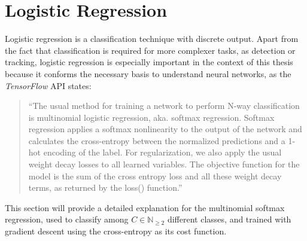 

\section{Logistic Regression} \label{logreg}

Logistic regression is a classification technique with discrete output. Apart from the fact that classification is required for more complexer tasks, as detection or tracking, logistic regression is especially important in the context of this thesis because it conforms the necessary basis to understand neural networks, as the {\it TensorFlow} API states:
\begin{quote}
  ``The usual method for training a network to perform N-way classification is multinomial logistic regression, aka. softmax regression. Softmax regression applies a softmax nonlinearity to the output of the network and calculates the cross-entropy between the normalized predictions and a 1-hot encoding of the label. For regularization, we also apply the usual weight decay losses to all learned variables. The objective function for the model is the sum of the cross entropy loss and all these weight decay terms, as returned by the loss() function.''\cite{tf-cnn}
\end{quote}

This section will provide a detailed explanation for the multinomial softmax regression, used to classify among \(C\in\mathbb N_{\geq 2}\) different classes, and trained with gradient descent using the cross-entropy as its cost function.

